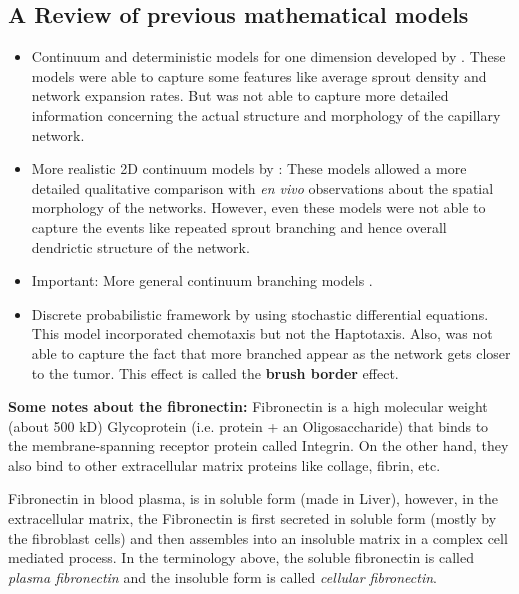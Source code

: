 \subsection{A Review of previous mathematical models}
\begin{itemize}
	\item Continuum and deterministic models for one dimension developed by \cite{Liotta1977,Balding1985,Chaplain1993,Byrne1995a,Orme1996}. These models were able to capture some features like average sprout density and network expansion rates. But was not able to capture more detailed information concerning the actual structure and morphology of the capillary network.
	\item More realistic 2D continuum models by \cite{Chaplain1995,Orme1997}: These models allowed a more detailed qualitative comparison with \emph{en vivo} observations about the spatial morphology of the networks. However, even these models were not able to capture the events like repeated sprout branching and hence overall dendrictic structure of the network.
	\item {\color{orange} Important: }More general continuum branching models \cite{Meinhardt1976,Meinhardt1982,Ermentrout1993}.
	\item Discrete probabilistic framework by \cite{Stokes1991} using stochastic differential equations. This model incorporated chemotaxis but not the Haptotaxis. Also, was not able to capture the fact that more branched appear as the network gets closer to the tumor. This effect is called the \textbf{brush border} effect\cite{Gimbrone1974,Ausprunk1977,Zawicki1981,Muthukkaruppan1982,Sholley1984}.
\end{itemize}



\textbf{Some notes about the fibronectin:} Fibronectin is a high molecular weight (about 500 kD) Glycoprotein (i.e. protein  + an Oligosaccharide) that binds to the membrane-spanning receptor protein called Integrin. On the other hand, they also bind to other extracellular matrix proteins like collage, fibrin, etc.

Fibronectin in blood plasma, is in soluble form (made in Liver), however, in the extracellular matrix, the Fibronectin is first secreted in soluble form (mostly by the fibroblast cells) and then assembles into an insoluble matrix in a complex cell mediated process. In the terminology above, the soluble fibronectin is called \emph{plasma fibronectin} and the insoluble form is called \emph{cellular fibronectin}.

